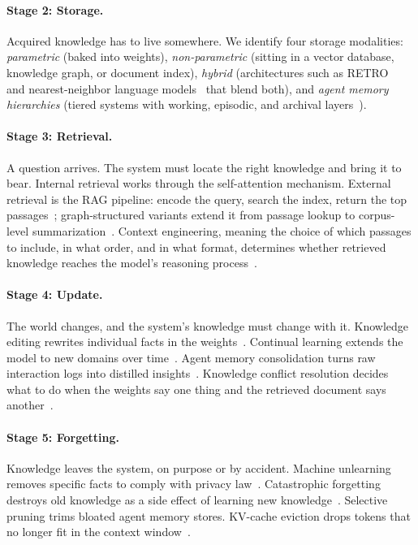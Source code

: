 \documentclass[manuscript, screen, review]{jair}
\begin{document}
\paragraph{Stage 2: Storage.} Acquired knowledge has to live somewhere. We identify four storage modalities: \textit{parametric} (baked into weights), \textit{non-parametric} (sitting in a vector database, knowledge graph, or document index), \textit{hybrid} (architectures such as RETRO~\citep{borgeaud2022retro} and nearest-neighbor language models~\citep{khandelwal2020knnlm} that blend both), and \textit{agent memory hierarchies} (tiered systems with working, episodic, and archival layers~\citep{packer2023memgpt}).

\paragraph{Stage 3: Retrieval.} A question arrives. The system must locate the right knowledge and bring it to bear. Internal retrieval works through the self-attention mechanism. External retrieval is the RAG pipeline: encode the query, search the index, return the top passages~\citep{karpukhin2020dpr}; graph-structured variants extend it from passage lookup to corpus-level summarization~\citep{edge2024graphrag}. Context engineering, meaning the choice of which passages to include, in what order, and in what format, determines whether retrieved knowledge reaches the model's reasoning process~\citep{liu2024lost}.

\paragraph{Stage 4: Update.} The world changes, and the system's knowledge must change with it. Knowledge editing rewrites individual facts in the weights~\citep{meng2022rome, meng2023memit}. Continual learning extends the model to new domains over time~\citep{kirkpatrick2017ewc}. Agent memory consolidation turns raw interaction logs into distilled insights~\citep{park2023generative}. Knowledge conflict resolution decides what to do when the weights say one thing and the retrieved document says another~\citep{xie2024conflicts, longpre2021entity}.

\paragraph{Stage 5: Forgetting.} Knowledge leaves the system, on purpose or by accident. Machine unlearning removes specific facts to comply with privacy law~\citep{jang2023unlearning, maini2024tofu}. Catastrophic forgetting destroys old knowledge as a side effect of learning new knowledge~\citep{kirkpatrick2017ewc, luo2023catastrophic}. Selective pruning trims bloated agent memory stores. KV-cache eviction drops tokens that no longer fit in the context window~\citep{xiao2024streamingllm}.
\end{document}
